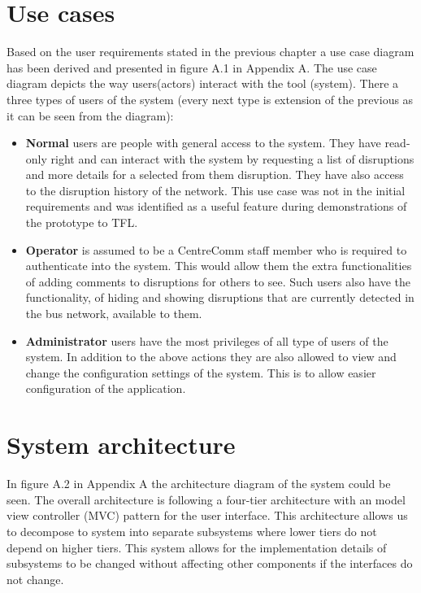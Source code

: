 \section{Use cases}
Based on the user requirements stated in the previous chapter a use case diagram has been derived and presented in figure A.1 in Appendix A. The use case diagram depicts the way users(actors) interact with the tool (system). There a three types of users of the system (every next type is extension of the previous as it can be seen from the diagram):
\begin{itemize}
	\item \textbf{Normal} users are people with general access to the system. They have read-only right and can interact with the system by requesting a list of disruptions and more details for a selected from them disruption. They have also access to the disruption history of the network. This use case was not in the initial requirements and was identified as a useful feature during demonstrations of the prototype to TFL.
	\item \textbf{Operator} is assumed to be a CentreComm staff member who is required to authenticate into the system. This would allow them the extra functionalities of adding comments to disruptions for others to see. Such users also have the functionality, of hiding and showing disruptions that are currently detected in the bus network, available to them.
	\item \textbf{Administrator} users have the most privileges of all type of users of the system. In addition to the above actions they are also allowed to view and change the configuration settings of the system. This is to allow easier configuration of the application.
\end{itemize}

\section{System architecture}
In figure A.2 in Appendix A the architecture diagram of the system could be seen. The overall architecture is following a four-tier architecture with an model view controller (MVC) pattern for the user interface. This architecture allows us to decompose to system into separate subsystems where lower tiers do not depend on higher tiers. This system allows for the implementation details of subsystems to be changed without affecting other components if the interfaces do not change.

